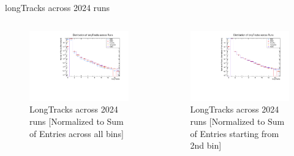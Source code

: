 \begin{frame}{longTracks across 2024 runs}
	\begin{columns}
		\begin{column}{0.55 \linewidth}
			\begin{figure}
				\includegraphics[width=\linewidth]{./RunwisePlots/longTracks_runwise.pdf}
				\caption{LongTracks across 2024 runs [Normalized to Sum of Entries across all bins]}
			\end{figure}
		\end{column}
		\begin{column}{0.55 \linewidth}
			\begin{figure}
				\includegraphics[width=\linewidth]{RunwisePlots/longTracks_normalisedfrom2_runwise.pdf}
				\caption{LongTracks across 2024 runs [Normalized to Sum of Entries starting from 2nd bin]}

\end{figure}
\end{column}
\end{columns}
\end{frame}
